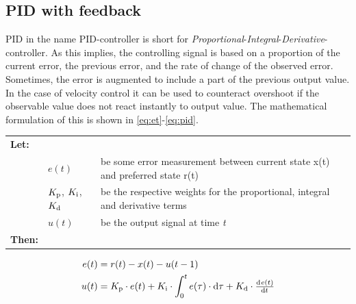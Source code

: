 \documentclass[11pt]{article}
\begin{document}
\subsection{PID with feedback}
PID in the name PID-controller is short for
\emph{Proportional}-\emph{Integral}-\emph{Derivative}-controller. As this
implies, the controlling signal is based on a proportion of the current error,
the previous error, and the rate of change of the observed error. Sometimes, the
error is augmented to include a part of the previous output value. In the case
of velocity control it can be used to counteract overshoot if the observable
value does not react instantly to output value. The mathematical formulation of
this is shown in \ref{eq:et}-\vref*{eq:pid}.\par \vspace{10pt} {\footnotesize
  \begin{tabular}{l l l}
    \textbf{Let:} \\
 &$e(t)$ &be some error measurement between current state x(t) and preferred state r(t)\\
 &${K_{\textup{p}}}$, ${K_{\textup{i}}}$, ${K_{\textup{d}}}$ &be the respective weights for the proportional, integral and derivative terms \\
 &$u(t)$ &be the output signal at time \emph{t} \\
    \textbf{Then:}
  \end{tabular}
  \begin{align}
    e(t) &= r(t) - x(t) - u(t-1)\label{eq:et}\\
    u(t) &= \di{K}{p}\cdot e(t) + \di{K}{i} \cdot\int_{0}^{t}e(\tau)\cdot \dif\tau + \di{K}{d} \cdot \od{e(t)}{t}\label{eq:pid}
  \end{align}}
\par
\end{document}
